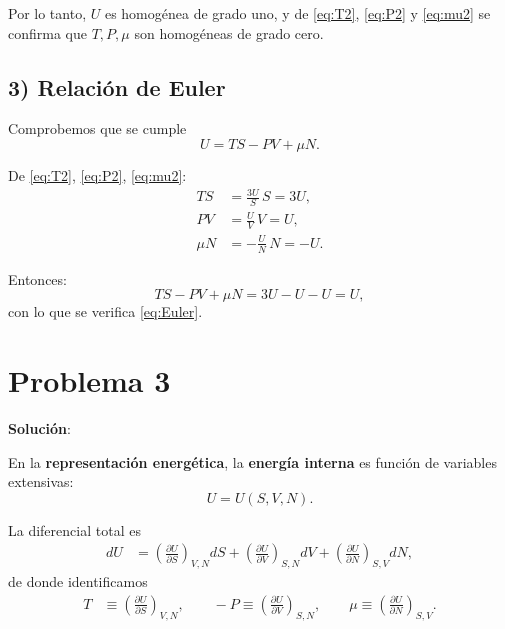 \documentclass{article}
\begin{document}
Por lo tanto, \(U\) es homogénea de grado uno, y de \eqref{eq:T2}, \eqref{eq:P2} y \eqref{eq:mu2} se confirma que \(T,P,\mu\) son homogéneas de grado cero.

\subsection*{3) Relación de Euler}

Comprobemos que se cumple
\begin{equation}
U = T S - P V + \mu N.
\label{eq:Euler}
\end{equation}

De \eqref{eq:T2}, \eqref{eq:P2}, \eqref{eq:mu2}:
\begin{equation}
\begin{split}
TS &= \tfrac{3U}{S}\,S = 3U, \\[6pt]
PV &= \tfrac{U}{V}\,V = U, \\[6pt]
\mu N &= -\tfrac{U}{N}\,N = -U.
\end{split}
\end{equation}

Entonces:
\begin{equation}
TS - PV + \mu N = 3U - U - U = U,
\end{equation}
con lo que se verifica \eqref{eq:Euler}.


\section*{Problema 3}

\textcolor{Cinnabar}{\textbf{Solución}}:

En la \textbf{representación energética}, la 
\textcolor{orange(colorwheel)}{\textbf{energía interna}} es función de variables extensivas:
\begin{equation}
U = U(S,V,N).
\label{eq:p3-U-general}
\end{equation}

La diferencial total es
\begin{equation}
\begin{split}
dU
&= \left( \frac{\partial U}{\partial S} \right)_{V,N} dS
 + \left( \frac{\partial U}{\partial V} \right)_{S,N} dV
 + \left( \frac{\partial U}{\partial N} \right)_{S,V} dN,
\end{split}
\label{eq:p3-dU}
\end{equation}
de donde identificamos
\begin{equation}
\begin{split}
T &\equiv \left( \frac{\partial U}{\partial S} \right)_{V,N},
\qquad
-P \equiv \left( \frac{\partial U}{\partial V} \right)_{S,N},
\qquad
\mu \equiv \left( \frac{\partial U}{\partial N} \right)_{S,V}.
\end{split}
\label{eq:p3-intensivas}
\end{equation}
\end{document}
